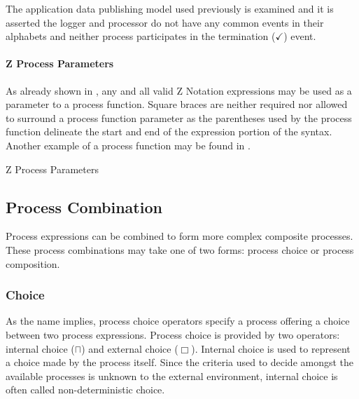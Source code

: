 \documentclass[letterpaper,10pt,draft]{book}
\begin{document}
The application data publishing model used previously is examined and it is asserted
the logger and processor do not have any common events in their alphabets and neither
process participates in the termination ($\checkmark$) event.

\paragraph{Z Process Parameters}
   \label{sect:CSPZProcParam}

As already shown in , any and all valid Z Notation expressions
may be used as a parameter to a process function.  Square braces are neither required
nor allowed to surround a process function parameter as the parentheses used by the
process function delineate the start and end of the expression portion of the syntax.
Another example of a process function may be found in .

\begin{example}
\begin{minipage}[t]{0.50\linewidth}
   
\end{minipage}
\begin{minipage}[t]{0.49\linewidth}
   \azbox
   
\end{minipage}

   \caption{Z Process Parameters}
   \label{ex:ZProcParam}
\end{example}

\subsection{Process Combination}
   \label{sect:ProcCombine}

Process expressions can be combined to form more complex composite processes.  These
process combinations may take one of two forms: process choice or process composition.

\subsubsection{Choice}
   \label{sect:ProcChoice}

As the name implies, process choice operators specify a process offering a choice
between two process expressions.  Process choice is provided by two operators: internal
choice ($\sqcap$) and external choice ($\Box$).  Internal choice is used to represent
a choice made by the process itself.  Since the criteria used to decide amongst
the available processes is unknown to the external environment, internal choice
is often called non-deterministic choice.
\end{document}
